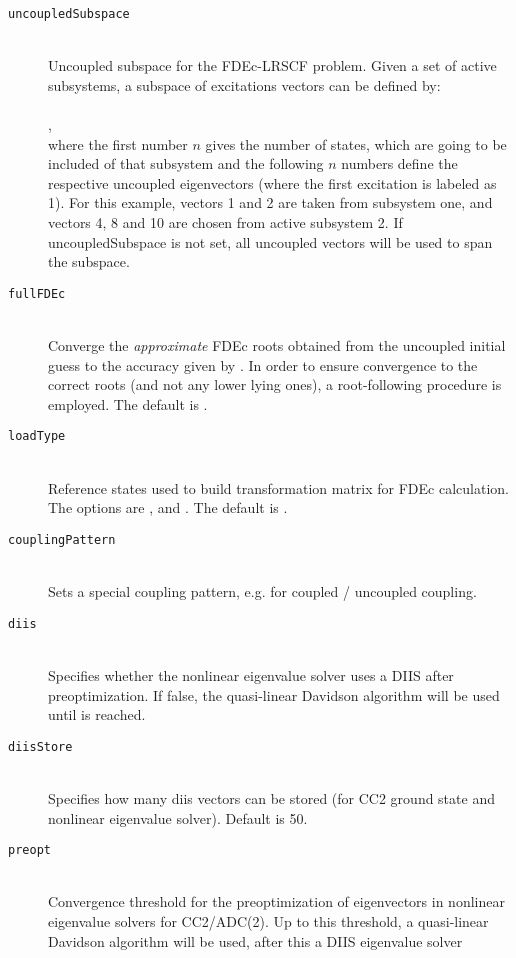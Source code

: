 \begin{description}
    \item [\texttt{uncoupledSubspace}]\hfill \\
    Uncoupled subspace for the FDEc-LRSCF problem. Given a set of active subsystems, a subspace of excitations vectors can be defined by: \\   \\
    , \\ where the first number $n$ gives the number of states, which are going to be included of that subsystem and the following $n$ numbers define the respective uncoupled eigenvectors (where the first excitation is labeled as 1). For this example, vectors 1 and 2 are taken from subsystem one, and vectors 4, 8 and 10 are chosen from active subsystem 2. If uncoupledSubspace is not set, all uncoupled vectors will be used to span the subspace.
    \item [\texttt{fullFDEc}]\hfill \\
    Converge the \emph{approximate} FDEc roots obtained from the uncoupled initial guess to the accuracy given by . In order to ensure convergence to the correct roots (and not any lower lying ones), a root-following procedure is employed. The default is .
    \item [\texttt{loadType}]\hfill \\
    Reference states used to build transformation matrix for FDEc calculation. The options are ,  and . The default is .
    \item[\texttt{couplingPattern}]\hfill\\
    Sets a special coupling pattern, e.g. for coupled / uncoupled coupling.
    \item[\texttt{diis}]\hfill\\
    Specifies whether the nonlinear eigenvalue solver uses a DIIS after preoptimization. If false, the quasi-linear Davidson algorithm will be used until 
    is reached.
    \item[\texttt{diisStore}]\hfill\\
    Specifies how many diis vectors can be stored (for CC2 ground state and nonlinear
    eigenvalue solver). Default is 50.
    \item[\texttt{preopt}]\hfill\\
    Convergence threshold for the preoptimization of eigenvectors in nonlinear
    eigenvalue solvers for CC2/ADC(2). Up to this threshold, a quasi-linear
    Davidson algorithm will be used, after this a DIIS eigenvalue solver 

\end{description}
